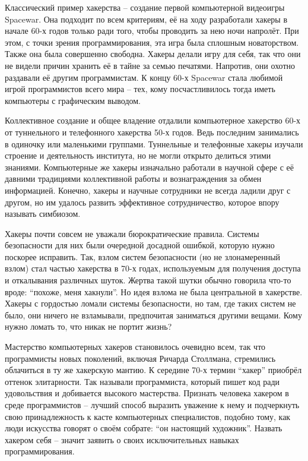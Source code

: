 Классический пример хакерства -- создание первой компьютерной видеоигры Spacewar. Она подходит по всем критериям, её на ходу разработали хакеры в начале 60-х годов только ради того, чтобы проводить за нею ночи напролёт. При этом, с точки зрения программирования, эта игра была сплошным новаторством. Также она была совершенно свободна. Хакеры делали игру для себя, так что они не видели причин хранить её в тайне за семью печатями. Напротив, они охотно раздавали её другим программистам. К концу 60-х Spacewar стала любимой игрой программистов всего мира -- тех, кому посчастливилось тогда иметь компьютеры с графическим выводом.

Коллективное создание и общее владение отдалили компьютерное хакерство 60-х от туннельного и телефонного хакерства 50-х годов. Ведь последним занимались в одиночку или маленькими группами. Туннельные и телефонные хакеры изучали строение и деятельность института, но не могли открыто делиться этими знаниями. Компьютерные же хакеры изначально работали в научной сфере с её давними традициями коллективной работы и вознаграждения за обмен информацией. Конечно, хакеры и научные сотрудники не всегда ладили друг с другом, но им удалось развить эффективное сотрудничество, которое впору называть симбиозом.

Хакеры почти совсем не уважали бюрократические правила. Системы безопасности для них были очередной досадной ошибкой, которую нужно поскорее исправить. Так, взлом систем безопасности (но не злонамеренный взлом) стал частью хакерства в 70-х годах, используемым для получения доступа и откалывания различных шуток. Жертва такой шутки обычно говорила что-то вроде: \enquote{похоже, меня хакнули}. Но идея взлома не была центральной в хакерстве. Хакеры с гордостью ломали системы безопасности, но там, где таких систем не было, они ничего не взламывали, предпочитая заниматься другими вещами. Кому нужно ломать то, что никак не портит жизнь?

Мастерство компьютерных хакеров становилось очевидно всем, так что программисты новых поколений, включая Ричарда Столлмана, стремились облачиться в ту же хакерскую мантию. К середине 70-х термин \enquote{хакер} приобрёл оттенок элитарности. Так называли программиста, который пишет код ради удовольствия и добивается высокого мастерства. Признать человека хакером в среде программистов -- лучший способ выразить уважение к нему и подчеркнуть свою принадлежность к касте компьютерных специалистов, подобно тому, как люди искусства говорят о своём собрате: \enquote{он настоящий художник}. Назвать хакером себя -- значит заявить о своих исключительных навыках программирования.

